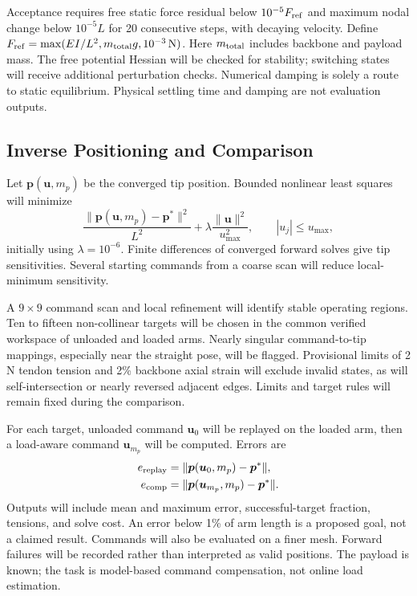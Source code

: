 \documentclass[letterpaper,10pt,conference]{ieeeconf}
\newcommand{\vct}[1]{\boldsymbol{#1}}
\begin{document}
Acceptance requires free static force residual below $10^{-5}F_{\rm ref}$
and maximum nodal change below $10^{-5}L$ for 20 consecutive steps,
with decaying velocity. Define
$F_{\rm ref}=\max(EI/L^2,m_{\rm total}g,10^{-3}\,\mathrm{N})$.
Here $m_{\rm total}$ includes backbone and payload mass. The free
potential Hessian will be checked for stability; switching
states will receive additional perturbation checks. Numerical damping
is solely a route to static equilibrium. Physical settling time and
damping are not evaluation outputs.

\subsection{Inverse Positioning and Comparison}
Let $\vct{p}(\vct{u},m_p)$ be the converged tip position.
Bounded nonlinear least squares will minimize
\begin{equation}
\frac{\|\vct{p}(\vct{u},m_p)-\vct{p}^*\|^2}{L^2}
+\lambda\frac{\|\vct{u}\|^2}{u_{\max}^2},
\qquad |u_j|\leq u_{\max},
\end{equation}
initially using $\lambda=10^{-6}$. Finite differences of converged
forward solves give tip sensitivities. Several starting commands from
a coarse scan will reduce local-minimum sensitivity.

A $9\times9$ command scan and local refinement will identify stable
operating regions. Ten to fifteen non-collinear targets will be chosen
in the common verified workspace of unloaded and loaded arms.
Nearly singular command-to-tip mappings, especially near the straight
pose, will be flagged. Provisional limits of 2 N tendon tension and
2\% backbone axial strain will exclude invalid states, as will
self-intersection or nearly reversed adjacent edges. Limits and target
rules will remain fixed during the comparison.

For each target, unloaded command $\vct{u}_0$ will be replayed on the
loaded arm, then a load-aware command $\vct{u}_{m_p}$ will be computed.
Errors are
\begin{equation}
\begin{split}
e_{\rm replay}&=\|\vct{p}(\vct{u}_0,m_p)-\vct{p}^*\|,\\
e_{\rm comp}&=\|\vct{p}(\vct{u}_{m_p},m_p)-\vct{p}^*\|.
\end{split}
\end{equation}
Outputs will include mean and maximum error, successful-target
fraction, tensions, and solve cost. An error below 1\% of arm length
is a proposed goal, not a claimed result. Commands will also be
evaluated on a finer mesh. Forward failures will be recorded rather
than interpreted as valid positions. The payload is known; the task
is model-based command compensation, not online load estimation.
\end{document}

